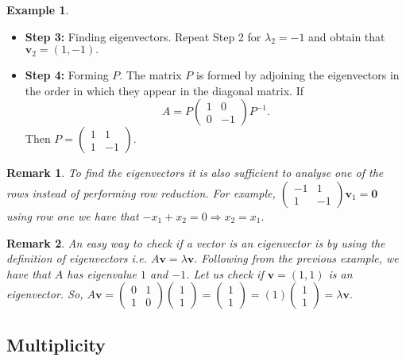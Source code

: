 \documentclass[12pt, a4paper]{article}
\newcommand{\imply}{\Rightarrow}
\newtheorem*{remark}{Remark}
\theoremstyle{definition}
\newtheorem*{example}{Example}
\theoremstyle{plain}
\begin{document}
\begin{example}
\begin{itemize}
	\item \textbf{Step 3:} Finding eigenvectors. Repeat Step 2 for $\lambda_2=-1$ and obtain that $\mathbf{v}_2 = (1,-1).$

	\item \textbf{Step 4:} Forming $P.$ The matrix $P$ is formed by adjoining the eigenvectors in the order in which they appear in the diagonal matrix. If$$A=P\begin{pmatrix} 1 & 0 \\ 0 & -1 \end{pmatrix}P^{-1}.$$ Then $P =\begin{pmatrix} 1 &1 \\ 1 &-1\end{pmatrix}.$

\end{itemize}
\end{example}

\begin{remark}
To find the eigenvectors it is also sufficient to analyse one of the rows instead of performing row reduction. For example, $\begin{pmatrix} -1 & 1 \\ 1 & -1 \end{pmatrix}\mathbf{v}_1=\mathbf{0}$ using row one we have that $-x_1+x_2=0 \imply x_2=x_1.$
\end{remark}

\begin{remark}
An easy way to check if a vector is an eigenvector is by using the definition of eigenvectors i.e. $A\mathbf{v}=\lambda \mathbf{v}.$ Following from the previous example, we have that $A$ has eigenvalue $1$ and $-1$. Let us check if $\mathbf{v}=(1,1)$ is an eigenvector. So, $A\mathbf{v}=\begin{pmatrix} 0 & 1 \\ 1 & 0 \end{pmatrix} \begin{pmatrix} 1 \\1 \end{pmatrix} = \begin{pmatrix} 1 \\ 1 \end{pmatrix} = (1) \begin{pmatrix} 1 \\ 1 \end{pmatrix} = \lambda \mathbf{v}.$
\end{remark}

\subsection{Multiplicity}
\end{document}
